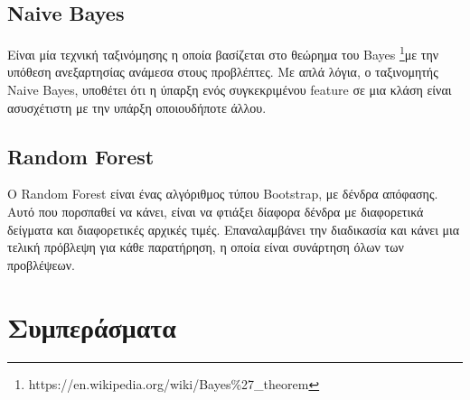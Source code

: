 \subsection{Naive Bayes}

Είναι μία τεχνική ταξινόμησης η οποία βασίζεται στο θεώρημα του Bayes \footnote{https://en.wikipedia.org/wiki/Bayes\%27\_theorem}με την υπόθεση ανεξαρτησίας ανάμεσα στους προβλέπτες. Με απλά λόγια, ο ταξινομητής Naive Bayes, υποθέτει ότι η ύπαρξη ενός συγκεκριμένου feature σε μια κλάση είναι ασυσχέτιστη με την υπάρξη οποιουδήποτε άλλου. 

\subsection{Random Forest}

O Random Forest είναι ένας αλγόριθμος τύπου Bootstrap, με δένδρα απόφασης. Αυτό που πορσπαθεί να κάνει, είναι να φτιάξει δίαφορα δένδρα με διαφορετικά δείγματα και διαφορετικές αρχικές τιμές. Επαναλαμβάνει την διαδικασία και κάνει μια τελική πρόβλεψη για κάθε παρατήρηση, η οποία είναι συνάρτηση όλων των προβλέψεων.

\hfill




\section{Συμπεράσματα}

